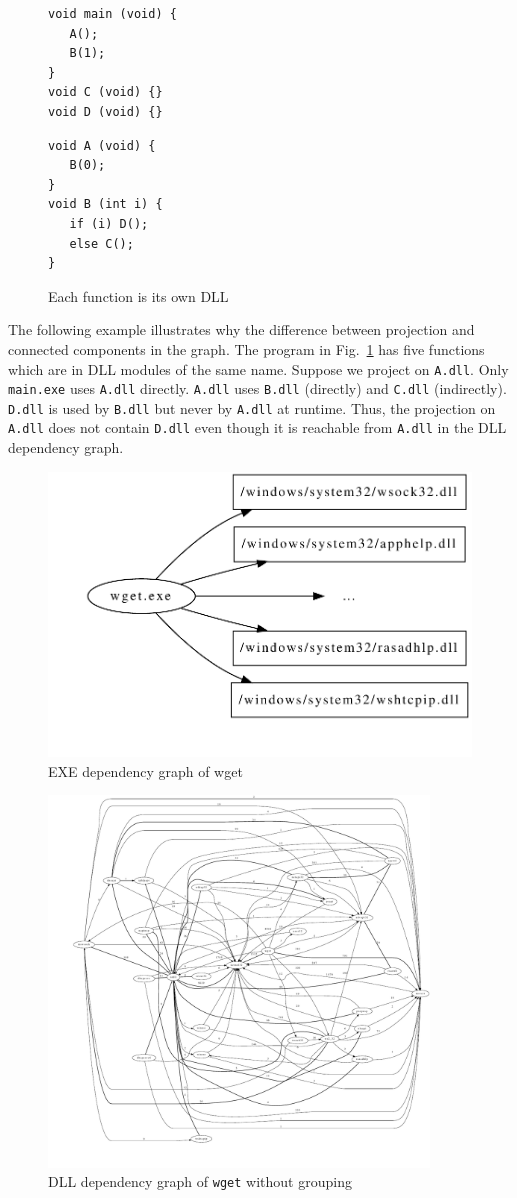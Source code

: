 \begin{figure}
\begin{minipage}[t]{3.5cm}
\begin{verbatim}
void main (void) { 
   A();
   B(1);
}
void C (void) {} 
void D (void) {}
\end{verbatim}
\end{minipage}
\hspace{1.0cm}
\begin{minipage}[t]{3.0cm}
\begin{verbatim}
void A (void) {
   B(0);
}
void B (int i) {
   if (i) D();
   else C();
}
\end{verbatim}
\end{minipage}
\caption{Each function is its own DLL}
\label{fig:indcalls}
\end{figure}

The following example illustrates why the difference between
projection and connected components in the graph.
The program in Fig.~\ref{fig:indcalls} has
five functions which are in DLL modules of the same name.
Suppose we project on {\tt A.dll}.
Only {\tt main.exe} uses {\tt A.dll} directly.
{\tt A.dll} uses {\tt B.dll} (directly) and
{\tt C.dll} (indirectly).
{\tt D.dll} is used by {\tt B.dll} but never by {\tt A.dll} at runtime.
Thus, the projection on {\tt A.dll} does not contain {\tt D.dll} even though
it is reachable from {\tt A.dll} in the DLL dependency graph.

\begin{figure}[tbh]
\centering
\includegraphics[width=0.4\columnwidth]{dep-wget-exe-split.pdf}
\caption{EXE dependency graph of wget}
\label{fig:wget-exe-split}
\end{figure}

\begin{figure}[htb]
\centering
\includegraphics[width=0.9\textwidth]{dep-wget-nogroup.pdf}
\caption{DLL dependency graph of {\tt wget} without grouping}
\label{fig:wget-nogroup}
\end{figure}

